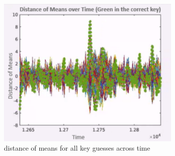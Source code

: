 \begin{figure}[!ht]
    \centering
    \includegraphics[width=0.8\textwidth]{images/Lecture6/all.png}
    \caption{distance of means for all key guesses across time} \label{fig:all}
\end{figure}